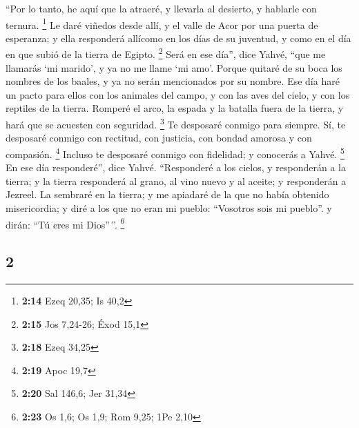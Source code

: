 \begin{paracol}{2}
 ``Por lo tanto, he aquí que la atraeré, y llevarla al
desierto, y hablarle con ternura. \footnote{\textbf{2:14} Ezeq 20,35; Is
  40,2}  Le daré viñedos desde allí, y el valle de Acor
por una puerta de esperanza; y ella responderá allícomo en los días de
su juventud, y como en el día en que subió de la tierra de Egipto.
\footnote{\textbf{2:15} Jos 7,24-26; Éxod 15,1}  Será en
ese día'', dice Yahvé, ``que me llamarás `mi marido', y ya no me llame
`mi amo'.  Porque quitaré de su boca los nombres de los
baales, y ya no serán mencionados por su nombre.  Ese día
haré un pacto para ellos con los animales del campo, y con las aves del
cielo, y con los reptiles de la tierra. Romperé el arco, la espada y la
batalla fuera de la tierra, y hará que se acuesten con seguridad.
\footnote{\textbf{2:18} Ezeq 34,25}  Te desposaré conmigo
para siempre. Sí, te desposaré conmigo con rectitud, con justicia, con
bondad amorosa y con compasión. \footnote{\textbf{2:19} Apoc 19,7}
 Incluso te desposaré conmigo con fidelidad; y conocerás
a Yahvé. \footnote{\textbf{2:20} Sal 146,6; Jer 31,34} 
En ese día responderé'', dice Yahvé. ``Responderé a los cielos, y
responderán a la tierra;  y la tierra responderá al
grano, al vino nuevo y al aceite; y responderán a Jezreel.
 La sembraré en la tierra; y me apiadaré de la que no
había obtenido misericordia; y diré a los que no eran mi pueblo:
``Vosotros sois mi pueblo''. y dirán: ``Tú eres mi Dios''\,''.
\footnote{\textbf{2:23} Os 1,6; Os 1,9; Rom 9,25; 1Pe 2,10}

\switchcolumn
\begin{otherlanguage}{english}

\hypertarget{section-3}{%
\section{2}\label{section-3}}


\end{otherlanguage}
\end{paracol}
